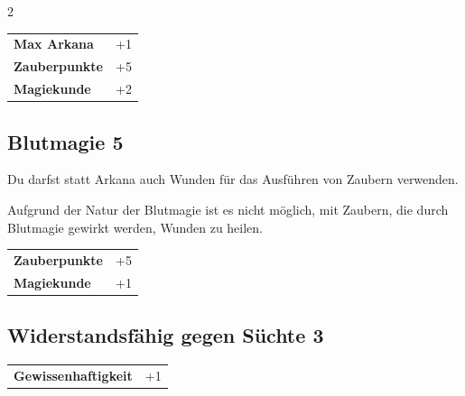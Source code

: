 \begin{multicols}{2}
\begin{tcolorbox}
\begin{tabular}{@{}ll@{}}
    \textbf{Max Arkana} & +1\\
    \textbf{Zauberpunkte} & +5\\
    \textbf{Magiekunde} & +2\\
\end{tabular}


\end{tcolorbox}

\begin{tcolorbox}
    \subsection*{Blutmagie \hfill \small{5 }}
    \tcblower
Du darfst statt Arkana auch Wunden für das Ausführen von Zaubern verwenden.

Aufgrund der Natur der Blutmagie ist es nicht möglich, mit Zaubern, die durch Blutmagie gewirkt werden, Wunden zu heilen.


\vspace{3mm}

\begin{tabular}{@{}ll@{}}
    \textbf{Zauberpunkte} & +5\\
    \textbf{Magiekunde} & +1\\
\end{tabular}


\end{tcolorbox}

\begin{tcolorbox}
    \subsection*{Widerstandsfähig gegen Süchte \hfill \small{3 }}
    \tcblower




\begin{tabular}{@{}ll@{}}
    \textbf{Gewissenhaftigkeit} & +1\\
\end{tabular}



\end{tcolorbox}
\end{multicols}
